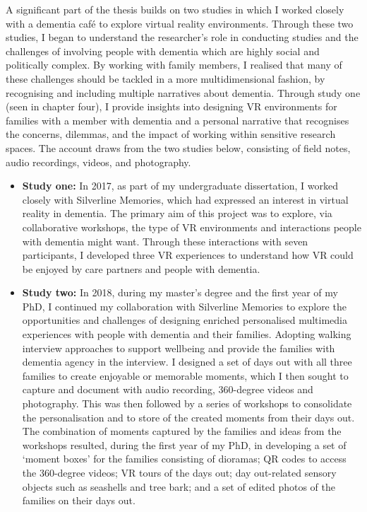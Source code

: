 A significant part of the thesis builds on two studies in which I worked closely with a dementia café to explore virtual reality environments. Through these two studies, I began to understand the researcher's role in conducting studies and the challenges of involving people with dementia which are highly social and politically complex. By working with family members, I realised that many of these challenges should be tackled in a more multidimensional fashion, by recognising and including multiple narratives about dementia. 
Through study one (seen in chapter four), I provide insights into designing VR environments for families with a member with dementia and a personal narrative that recognises the concerns, dilemmas, and the impact of working within sensitive research spaces. The account draws from the two studies below, consisting of field notes, audio recordings, videos, and photography. 
\begin{itemize}
    \item \textbf{Study one:} In 2017, as part of my undergraduate dissertation, I worked closely with Silverline Memories, which had expressed an interest in virtual reality in dementia. The primary aim of this project was to explore, via collaborative workshops, the type of VR environments and interactions people with dementia might want. Through these interactions with seven participants, I developed three VR experiences to understand how VR could be enjoyed by care partners and people with dementia.

    \item \textbf{Study two:} In 2018, during my master's degree and the first year of my PhD, I continued my collaboration with Silverline Memories to explore the opportunities and challenges of designing enriched personalised multimedia experiences with people with dementia and their families. Adopting walking interview approaches to support wellbeing and provide the families with dementia agency in the interview. I designed a set of days out with all three families to create enjoyable or memorable moments, which I then sought to capture and document with audio recording, 360-degree videos and photography. This was then followed by a series of workshops to consolidate the personalisation and to store of the created moments from their days out. The combination of moments captured by the families and ideas from the workshops resulted, during the first year of my PhD, in developing a set of `moment boxes' for the families consisting of dioramas; QR codes to access the 360-degree videos; VR tours of the days out; day out-related sensory objects such as seashells and tree bark; and a set of edited photos of the families on their days out.

\end{itemize}
